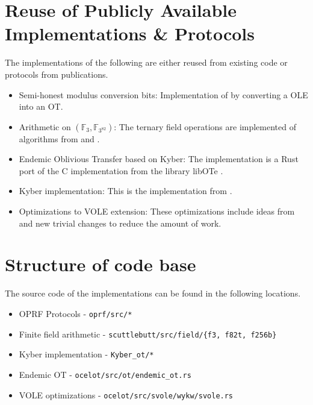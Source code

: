 \documentclass{article}
\newcommand{\F}{\mathbb{F}}
\begin{document}
\section{Reuse of Publicly Available Implementations \& Protocols}
The implementations of the following are either reused from existing code or protocols from publications.
\begin{itemize}
    \item Semi-honest modulus conversion bits: Implementation of \cite[Protocol 5.2]{C:DGHIKS21} by converting a OLE into an OT.
    \item Arithmetic on $(\F_3, \F_{3^{82}})$: The ternary field operations are implemented of algorithms from \cite{f3algo} and \cite{finitefieldmul}.
    \item Endemic Oblivious Transfer based on Kyber: The implementation is a Rust port of the C implementation from the library libOTe \cite{libOTe}.
    \item Kyber implementation: This is the implementation from \cite{Kyber}.
    \item Optimizations to VOLE extension: These optimizations include ideas from \cite{emp-zk} and new trivial changes to reduce the amount of work.
\end{itemize}

\section{Structure of code base}
The source code of the implementations can be found in the following locations.
\begin{itemize}
    \item OPRF Protocols - \texttt{oprf/src/*}
    \item Finite field arithmetic - \texttt{scuttlebutt/src/field/\{f3, f82t, f256b\}}
    \item Kyber implementation - \texttt{Kyber\_ot/*}
    \item Endemic OT - \texttt{ocelot/src/ot/endemic\_ot.rs}
    \item VOLE optimizations - \texttt{ocelot/src/svole/wykw/svole.rs}
\end{itemize}



\end{document}
